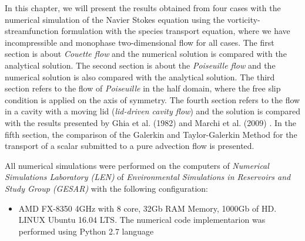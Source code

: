In this chapter, we will present the results obtained from 
four cases with the numerical simulation of the Navier Stokes 
equation using the vorticity-streamfunction formulation with 
the species transport equation, where we have incompressible 
and monophase two-dimensional flow for all cases. 
The first section is about \textit{Couette flow} and 
the numerical solution is compared with the analytical solution. 
The second section is about the \textit{Poiseuille flow} 
and the numerical solution is also compared with 
the analytical solution. The third section refers to the flow 
of \textit {Poiseuille} in the half domain, where the 
free slip condition is applied on the axis of symmetry. 
The fourth section refers to the flow in a cavity with 
a moving lid (\textit{lid-driven cavity flow}) 
and the solution is compared with the results presented 
by Ghia et al. (1982) \cite{ghia1982} and 
Marchi et al. (2009) \cite{marchi2009}. 
In the fifth section, the comparison of the Galerkin and 
Taylor-Galerkin Method for the transport of a scalar 
submitted to a pure advection flow is presented.

\medskip
All numerical simulations were performed on the computers 
of \textit {Numerical Simulations Laboratory (LEN)} 
of \textit {Environmental Simulations in Reservoirs and 
Study Group (GESAR)} with the following configuration:

\begin{itemize}
 \item AMD FX-8350 4GHz with 8 core, 32Gb RAM Memory, 1000Gb of HD.
       LINUX Ubuntu 16.04 LTS. The numerical code implementarion was
       performed using Python 2.7 language
\end{itemize}

\newpage
